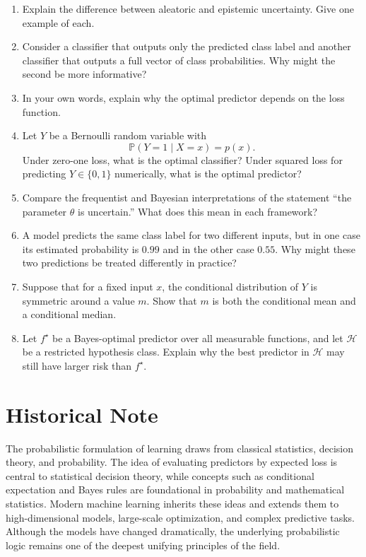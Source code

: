 \begin{enumerate}
    \item Explain the difference between aleatoric and epistemic uncertainty. Give one example of each.

    \item Consider a classifier that outputs only the predicted class label and another classifier that outputs a full vector of class probabilities. Why might the second be more informative?

    \item In your own words, explain why the optimal predictor depends on the loss function.

    \item Let $Y$ be a Bernoulli random variable with
    \[
    \mathbb{P}(Y=1\mid X=x)=p(x).
    \]
    Under zero-one loss, what is the optimal classifier? Under squared loss for predicting $Y\in\{0,1\}$ numerically, what is the optimal predictor?

    \item Compare the frequentist and Bayesian interpretations of the statement ``the parameter $\theta$ is uncertain.'' What does this mean in each framework?

    \item A model predicts the same class label for two different inputs, but in one case its estimated probability is $0.99$ and in the other case $0.55$. Why might these two predictions be treated differently in practice?

    \item Suppose that for a fixed input $x$, the conditional distribution of $Y$ is symmetric around a value $m$. Show that $m$ is both the conditional mean and a conditional median.

    \item Let $f^\star$ be a Bayes-optimal predictor over all measurable functions, and let $\mathcal{H}$ be a restricted hypothesis class. Explain why the best predictor in $\mathcal{H}$ may still have larger risk than $f^\star$.
\end{enumerate}

\section*{Historical Note}

The probabilistic formulation of learning draws from classical statistics, decision theory, and probability. The idea of evaluating predictors by expected loss is central to statistical decision theory, while concepts such as conditional expectation and Bayes rules are foundational in probability and mathematical statistics. Modern machine learning inherits these ideas and extends them to high-dimensional models, large-scale optimization, and complex predictive tasks. Although the models have changed dramatically, the underlying probabilistic logic remains one of the deepest unifying principles of the field.